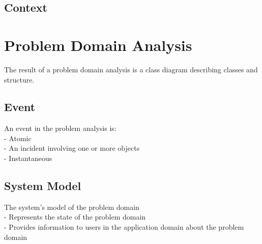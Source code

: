 \subsection*{Context}

\section{Problem Domain Analysis}
The result of a problem domain analysis is a class diagram describing classes and structure.

\subsection*{Event}
An event in the problem analysis is:\\
 - Atomic\\
 - An incident involving one or more objects\\
 - Instantaneous\\

 \subsection*{System Model}
 The system's model of the problem domain\\
 - Represents the state of the problem domain\\
 - Provides information to users in the application domain about the problem domain\\
 